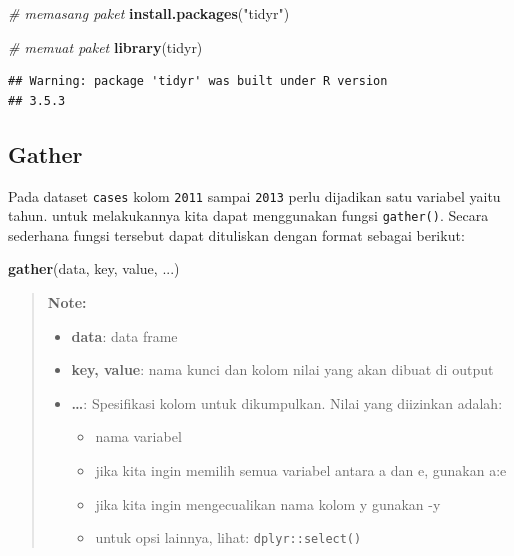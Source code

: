 \documentclass[]{book}
\newenvironment{Shaded}{\begin{snugshade}}{\end{snugshade}}
\newcommand{\KeywordTok}[1]{\textcolor[rgb]{0.13,0.29,0.53}{\textbf{#1}}}
\newcommand{\StringTok}[1]{\textcolor[rgb]{0.31,0.60,0.02}{#1}}
\newcommand{\CommentTok}[1]{\textcolor[rgb]{0.56,0.35,0.01}{\textit{#1}}}
\newcommand{\NormalTok}[1]{#1}
\providecommand{\tightlist}{%
  \setlength{\itemsep}{0pt}\setlength{\parskip}{0pt}}
\begin{document}
\begin{Shaded}
\begin{Highlighting}[]
\CommentTok{# memasang paket}
\KeywordTok{install.packages}\NormalTok{(}\StringTok{"tidyr"}\NormalTok{)}
\end{Highlighting}
\end{Shaded}

\begin{Shaded}
\begin{Highlighting}[]
\CommentTok{# memuat paket}
\KeywordTok{library}\NormalTok{(tidyr)}
\end{Highlighting}
\end{Shaded}

\begin{verbatim}
## Warning: package 'tidyr' was built under R version
## 3.5.3
\end{verbatim}

\subsection{Gather}\label{gather}

Pada dataset \texttt{cases} kolom \texttt{2011} sampai \texttt{2013}
perlu dijadikan satu variabel yaitu tahun. untuk melakukannya kita dapat
menggunakan fungsi \texttt{gather()}. Secara sederhana fungsi tersebut
dapat dituliskan dengan format sebagai berikut:

\begin{Shaded}
\begin{Highlighting}[]
\KeywordTok{gather}\NormalTok{(data, key, value, ...)}
\end{Highlighting}
\end{Shaded}

\begin{quote}
\textbf{Note: }

\begin{itemize}
\tightlist
\item
  \textbf{data}: data frame
\item
  \textbf{key, value}: nama kunci dan kolom nilai yang akan dibuat di
  output
\item
  \textbf{\ldots{}}: Spesifikasi kolom untuk dikumpulkan. Nilai yang
  diizinkan adalah:

  \begin{itemize}
  \tightlist
  \item
    nama variabel
  \item
    jika kita ingin memilih semua variabel antara a dan e, gunakan a:e
  \item
    jika kita ingin mengecualikan nama kolom y gunakan -y
  \item
    untuk opsi lainnya, lihat: \texttt{dplyr::select()}
  \end{itemize}
\end{itemize}
\end{quote}
\end{document}
